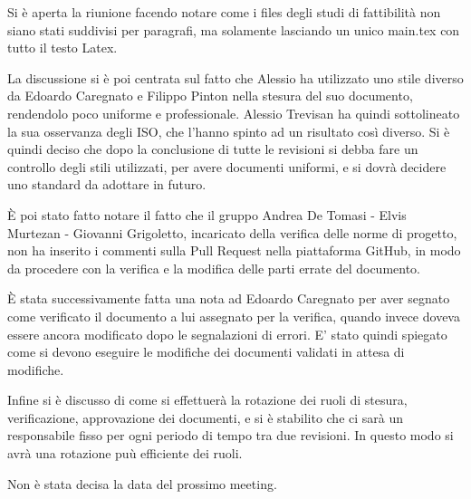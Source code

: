 Si è aperta la riunione facendo notare come i files degli studi di fattibilità non siano stati suddivisi per paragrafi,
ma solamente lasciando un unico main.tex con tutto il testo Latex.

La discussione si è poi centrata sul fatto che Alessio ha utilizzato uno stile diverso da Edoardo Caregnato e Filippo Pinton nella stesura
del suo documento, rendendolo poco uniforme e professionale. Alessio Trevisan ha quindi sottolineato la sua osservanza degli ISO, che l'hanno spinto ad un risultato così diverso. 
Si è quindi deciso che dopo la conclusione di tutte le revisioni si debba fare un controllo degli stili utilizzati, per avere documenti uniformi, e si dovrà decidere uno standard da adottare in futuro.

È poi stato fatto notare il fatto che il gruppo Andrea De Tomasi - Elvis Murtezan - Giovanni Grigoletto, incaricato della verifica delle norme di progetto, non ha inserito i commenti
sulla Pull Request nella piattaforma GitHub, in modo da procedere con la verifica e la modifica delle parti errate del documento.

È stata successivamente fatta una nota ad Edoardo Caregnato per aver segnato come verificato il documento a lui assegnato per la verifica, quando invece doveva essere
ancora modificato dopo le segnalazioni di errori. E' stato quindi spiegato come si devono eseguire le modifiche dei documenti validati in attesa di modifiche.

Infine si è discusso di come si effettuerà la rotazione dei ruoli di stesura, verificazione, approvazione dei documenti, e si è stabilito che ci sarà un responsabile
fisso per ogni periodo di tempo tra due revisioni. In questo modo si avrà una rotazione puù efficiente dei ruoli.

Non è stata decisa la data del prossimo meeting.